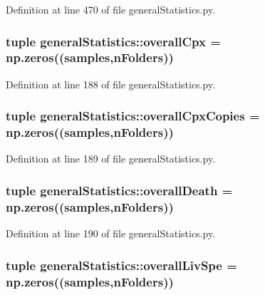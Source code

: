 \-Definition at line 470 of file general\-Statistics.\-py.

\hypertarget{namespacegeneral_statistics_a0377ba0e73cecde3c76c99eafd076d0a}{
\subsubsection[{overall\-Cpx}]{\setlength{\rightskip}{0pt plus 5cm}tuple {\bf general\-Statistics\-::overall\-Cpx} = np.\-zeros(({\bf samples},{\bf n\-Folders}))}}\label{namespacegeneral_statistics_a0377ba0e73cecde3c76c99eafd076d0a}


\-Definition at line 188 of file general\-Statistics.\-py.

\hypertarget{namespacegeneral_statistics_a7752c6b40eefef937d0b9e67726c8f6c}{
\subsubsection[{overall\-Cpx\-Copies}]{\setlength{\rightskip}{0pt plus 5cm}tuple {\bf general\-Statistics\-::overall\-Cpx\-Copies} = np.\-zeros(({\bf samples},{\bf n\-Folders}))}}\label{namespacegeneral_statistics_a7752c6b40eefef937d0b9e67726c8f6c}


\-Definition at line 189 of file general\-Statistics.\-py.

\hypertarget{namespacegeneral_statistics_abef0fa683159357a302601cdd6580039}{
\subsubsection[{overall\-Death}]{\setlength{\rightskip}{0pt plus 5cm}tuple {\bf general\-Statistics\-::overall\-Death} = np.\-zeros(({\bf samples},{\bf n\-Folders}))}}\label{namespacegeneral_statistics_abef0fa683159357a302601cdd6580039}


\-Definition at line 190 of file general\-Statistics.\-py.

\hypertarget{namespacegeneral_statistics_a4df112574861c37c17c7a7c842bdd4e0}{
\subsubsection[{overall\-Liv\-Spe}]{\setlength{\rightskip}{0pt plus 5cm}tuple {\bf general\-Statistics\-::overall\-Liv\-Spe} = np.\-zeros(({\bf samples},{\bf n\-Folders}))}}\label{namespacegeneral_statistics_a4df112574861c37c17c7a7c842bdd4e0}


